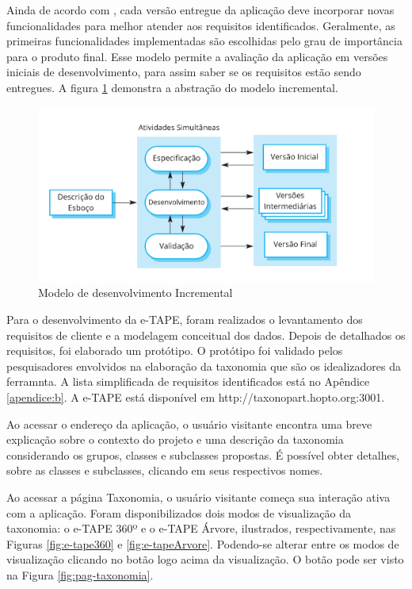 \par
Ainda de acordo com , cada versão entregue da aplicação deve incorporar novas funcionalidades para melhor atender aos requisitos identificados. Geralmente, as primeiras funcionalidades implementadas são escolhidas pelo grau de importância para o produto final. Esse modelo permite a avaliação da aplicação em versões iniciais de desenvolvimento, para assim saber 
se os requisitos estão sendo entregues. A figura \ref{fig:modelo-incremental} demonstra a abstração do modelo incremental.


\begin{figure}[!ht]
    \centering
    \includegraphics[scale=0.20]{./figuras/modelo_incremental.png}
    \caption{Modelo de desenvolvimento Incremental }
    \label{fig:modelo-incremental}
\end{figure}

\par
Para o desenvolvimento da e-TAPE, foram realizados o levantamento dos requisitos de cliente e a modelagem conceitual dos dados. Depois de detalhados os requisitos, foi elaborado um protótipo. O protótipo foi validado pelos pesquisadores envolvidos na elaboração da taxonomia que são os idealizadores da ferramnta. A lista simplificada de requisitos identificados está no Apêndice \ref{apendice:b}. A e-TAPE está disponível em http://taxonopart.hopto.org:3001.

\par
Ao acessar o endereço da aplicação, o usuário visitante encontra uma breve explicação sobre o contexto do projeto e uma descrição da taxonomia considerando os grupos,
classes e subclasses propostas. É possível obter detalhes, sobre as classes e subclasses, clicando em seus respectivos nomes. 

\par
Ao acessar a página Taxonomia, o usuário visitante começa sua interação ativa com a aplicação.
Foram disponibilizados dois modos de visualização da taxonomia: o e-TAPE 360º e o e-TAPE Árvore, ilustrados, respectivamente,
nas Figuras \ref{fig:e-tape360} e \ref{fig:e-tapeArvore}. Podendo-se alterar entre os modos de visualização clicando no botão logo acima da visualização.
O botão pode ser visto na Figura \ref{fig:pag-taxonomia}.

